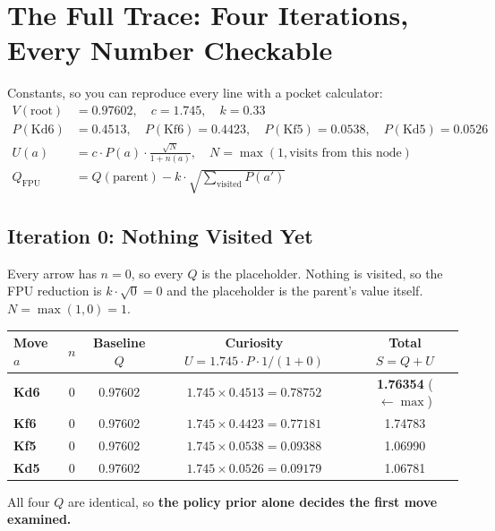 \chapter{The Full Trace: Four Iterations, Every Number Checkable}
\label{ch:full_trace}

Constants, so you can reproduce every line with a pocket calculator:
\begin{align*}
  V(\text{root}) &= 0.97602, \quad c = 1.745, \quad k = 0.33 \\
  P(\text{Kd6}) &= 0.4513, \quad P(\text{Kf6}) = 0.4423, \quad P(\text{Kf5}) = 0.0538, \quad P(\text{Kd5}) = 0.0526 \\[1ex]
  U(a) &= c \cdot P(a) \cdot \frac{\sqrt{N}}{1 + n(a)}, \quad N = \max(1, \text{visits from this node}) \\
  Q_{\text{FPU}} &= Q(\text{parent}) - k \cdot \sqrt{\sum_{\text{visited}} P(a')}
\end{align*}

\section{Iteration 0: Nothing Visited Yet}

Every arrow has $n = 0$, so every $Q$ is the placeholder. Nothing is visited, so the FPU reduction is $k \cdot \sqrt{0} = 0$ and the placeholder is the parent's value itself. $N = \max(1, 0) = 1$.

\begin{center}
\small
\begin{tabular}{lcccc}
  \toprule
  Move $a$ & $n$ & Baseline $Q$ & Curiosity $U = 1.745 \cdot P \cdot 1 / (1+0)$ & Total $S = Q + U$ \\
  \midrule
  \textbf{Kd6} & 0 & 0.97602 & $1.745 \times 0.4513 = 0.78752$ & \textbf{1.76354} \hfill ($\leftarrow \max$) \\
  \textbf{Kf6} & 0 & 0.97602 & $1.745 \times 0.4423 = 0.77181$ & 1.74783 \\
  \textbf{Kf5} & 0 & 0.97602 & $1.745 \times 0.0538 = 0.09388$ & 1.06990 \\
  \textbf{Kd5} & 0 & 0.97602 & $1.745 \times 0.0526 = 0.09179$ & 1.06781 \\
  \bottomrule
\end{tabular}
\end{center}

All four $Q$ are identical, so \textbf{the policy prior alone decides the first move examined.}

\begin{center}
\begin{minipage}{\linewidth}
\centering

\label{fig:iter0}
\end{minipage}
\end{center}

